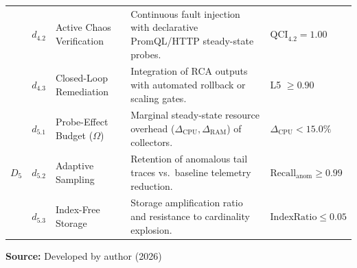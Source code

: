 \begin{table}[!ht]
\begin{tabularx}{\textwidth}{@{} l l p{3.6cm} X l @{}}
 & $d_{4.2}$ & Active Chaos Verification & Continuous fault injection with declarative PromQL/HTTP steady-state probes. & $\text{QCI}_{4.2} = 1.00$ \\
 & $d_{4.3}$ & Closed-Loop Remediation & Integration of RCA outputs with automated rollback or scaling gates. & L5 $\ge 0.90$ \\
\midrule
\multirow{3}{*}{\textbf{$D_5$}} & $d_{5.1}$ & Probe-Effect Budget ($\Omega$) & Marginal steady-state resource overhead ($\Delta_{\text{CPU}}, \Delta_{\text{RAM}}$) of collectors. & $\Delta_{\text{CPU}} < 15.0\%$ \\
 & $d_{5.2}$ & Adaptive Sampling & Retention of anomalous tail traces vs.\ baseline telemetry reduction. & $\text{Recall}_{\text{anom}} \ge 0.99$ \\
 & $d_{5.3}$ & Index-Free Storage & Storage amplification ratio and resistance to cardinality explosion. & $\text{IndexRatio} \le 0.05$ \\
\bottomrule
\end{tabularx}
\par\medskip
\ABNTEXfontereduzida\selectfont\textbf{Source:} Developed by author (2026)
\end{table}
